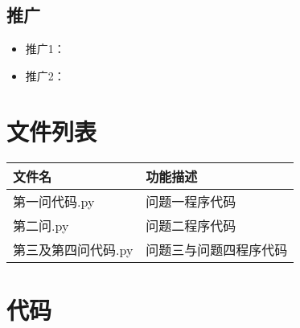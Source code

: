 \documentclass[withoutpreface,bwprint]{cumcmthesis}
\begin{document}
\subsection{推广}
\begin{itemize}[itemindent=2em]
    \item 推广1：
   \item 推广2：
\end{itemize}
\newpage
\nocite{*}

\newpage
\begin{appendices}
\section{文件列表}
\begin{table}[H]
\centering
\begin{tabularx}{\textwidth}{LL}
\toprule
文件名   & 功能描述 \\
\midrule
 第一问代码.py&问题一程序代码\\
第二问.py & 问题二程序代码 \\
第三及第四问代码.py&问题三与问题四程序代码\\

\bottomrule
\end{tabularx}
\label{tab:文件列表}
\end{table}

\section{代码}
\noindent 
% 
% 
%  


\end{appendices}
\end{document}
